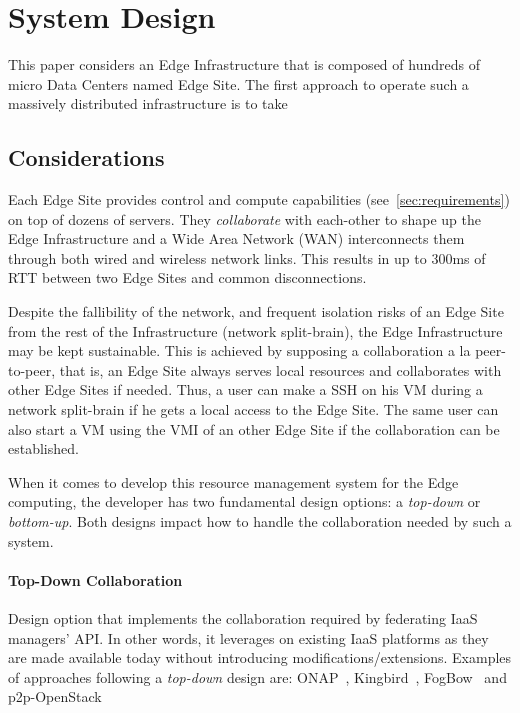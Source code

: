 


\section{System Design}
\label{system_design_considerations}
This paper considers an Edge Infrastructure that is composed of
hundreds of micro Data Centers named Edge Site. The first approach to operate such a massively distributed infrastructure is to take 


\subsection{Considerations}
\label{design_considerations}
 Each Edge Site
provides control and compute capabilities (see~\ref{sec:requirements})
on top of dozens of servers. They \emph{collaborate} with each-other
to shape up the Edge Infrastructure and a Wide Area Network (WAN)
interconnects them through both wired and wireless network links. This
results in up to 300ms of RTT between two Edge Sites and common
disconnections.

Despite the fallibility of the network, and frequent isolation risks
of an Edge Site from the rest of the Infrastructure (\ie network
split-brain), the Edge Infrastructure may be kept sustainable. This is
achieved by supposing a collaboration a la peer-to-peer, that is, an
Edge Site always serves local resources and collaborates with other
Edge Sites if needed. Thus, a user can make a SSH on his VM during a
network split-brain if he gets a local access to the Edge Site. The
same user can also start a VM using the VMI of an other Edge Site if
the collaboration can be established.

When it comes to develop this resource management system for the Edge
computing, the developer has two fundamental design options: a \emph{top-down} or
\emph{bottom-up}. Both designs impact how to handle the
collaboration needed by such a system.

\paragraph{Top-Down Collaboration}
Design option that implements the collaboration required by
federating IaaS managers' API. In other words, it leverages on existing IaaS platforms as they are made available today without introducing modifications/extensions. Examples of approaches following a \emph{top-down} design are: ONAP~\cite{onap}, Kingbird~\cite{kingbird}, FogBow~\cite{brasileiro2016fogbow} and p2p-OpenStack~\cite{ericsson-p2p}


